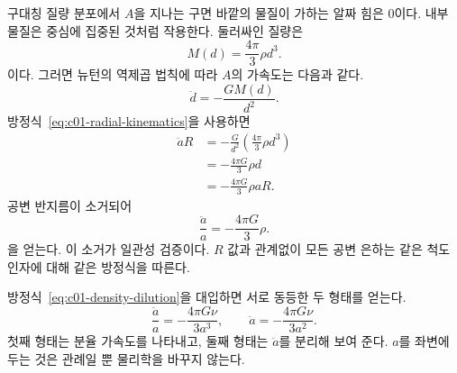 구대칭 질량 분포에서 \(A\)을 지나는 구면 바깥의 물질이 가하는 알짜 힘은 0이다. 내부 물질은 중심에 집중된 것처럼 작용한다. 둘러싸인 질량은 \begin{equation}
M(d)=\frac{4\pi}{3}\rho d^3.
\label{eq:c01-enclosed-mass}
\end{equation}이다. 그러면 뉴턴의 역제곱 법칙에 따라 \(A\)의 가속도는 다음과 같다. \begin{equation}
\ddot d=-\frac{GM(d)}{d^2}.
\end{equation}방정식~\eqref{eq:c01-radial-kinematics}을 사용하면 \begin{align}
\ddot a R
&=-\frac{G}{d^2}\left(\frac{4\pi}{3}\rho d^3\right) \\
&=-\frac{4\pi G}{3}\rho d \\
&=-\frac{4\pi G}{3}\rho aR.
\end{align}공변 반지름이 소거되어 \begin{equation}
\boxed{\frac{\ddot a}{a}=-\frac{4\pi G}{3}\rho.}
\label{eq:c01-acceleration}
\end{equation}을 얻는다. 이 소거가 일관성 검증이다. \(R\) 값과 관계없이 모든 공변 은하는 같은 척도 인자에 대해 같은 방정식을 따른다.

방정식~\eqref{eq:c01-density-dilution}을 대입하면 서로 동등한 두 형태를 얻는다. \begin{equation}
\frac{\ddot a}{a}=-\frac{4\pi G\nu}{3a^3},
\qquad
\ddot a=-\frac{4\pi G\nu}{3a^2}.
\label{eq:c01-acceleration-nu}
\end{equation}첫째 형태는 분율 가속도를 나타내고, 둘째 형태는 \(\ddot a\)를 분리해 보여 준다. \(a\)를 좌변에 두는 것은 관례일 뿐 물리학을 바꾸지 않는다.

\begin{classroomqa}\end{classroomqa}

\begin{classroomqa}\end{classroomqa}

